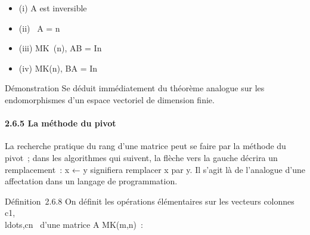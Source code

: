\begin{itemize}
\itemsep1pt\parskip0pt
\item
  (i) A est inversible
\item
  (ii) \mathrmrg~A = n
\item
  (iii) \existsB \in MK~(n), AB =
  In
\item
  (iv) \existsB \in MK(n), BA = In~
\end{itemize}

Démonstration Se déduit immédiatement du théorème analogue sur les
endomorphismes d'un espace vectoriel de dimension finie.

\paragraph{2.6.5 La méthode du pivot}

La recherche pratique du rang d'une matrice peut se faire par la méthode
du pivot~; dans les algorithmes qui suivent, la flèche vers la gauche
décrira un remplacement~: x ← y signifiera remplacer x par y. Il s'agit
là de l'analogue d'une affectation dans un langage de programmation.

Définition~2.6.8 On définit les opérations élémentaires sur les vecteurs
colonnes
c1,\\ldots,cn~
d'une matrice A \in MK(m,n)~:

